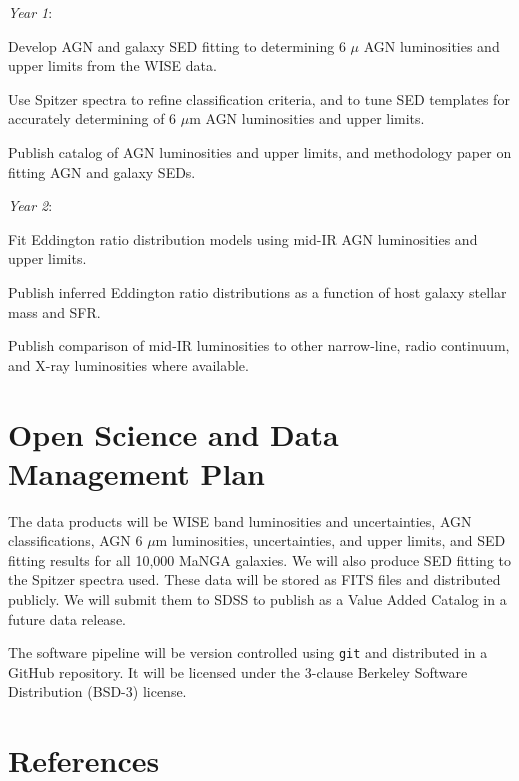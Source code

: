 \documentclass[12pt, preprint]{hacked-aastex}
\newlength{\mylen}
\newenvironment{ditemize}
{ \begin{list}{}{%
\setlength{\topsep}{0pt}%
\setlength{\partopsep}{3pt}%
\setlength{\itemsep}{1pt}\setlength{\parsep}{1pt}%
\setlength{\itemindent}{0pt}\setlength{\listparindent}{12pt}%
\setlength{\leftmargin}{24pt}\setlength{\rightmargin}{0in}%
\setlength{\labelsep}{6pt}\setlength{\labelwidth}{6pt}%
\setlength{\mylen}{3pt}
\renewcommand{\makelabel}{\makebox[\labelwidth][l]{\raisebox{\mylen}{\tiny$\bullet$}\hspace{\fill}}}}}
{\end{list}}
\begin{document}
\begin{ditemize}
\item {\it Year 1}: 
\begin{ditemize}
\item Develop AGN and galaxy SED fitting to determining 6 $\mu$ AGN luminosities and
upper limits from the WISE data.
\item Use Spitzer spectra to refine classification criteria, and to tune SED 
templates for accurately determining of 6 $\mu$m AGN luminosities and upper limits.
\item Publish catalog of AGN luminosities and upper limits, and methodology paper
on fitting AGN and galaxy SEDs.
\end{ditemize}
\item {\it Year 2}: 
\begin{ditemize}
\item Fit Eddington ratio distribution models 
using mid-IR AGN luminosities and upper limits.
\item Publish inferred  Eddington ratio distributions as a function of 
host galaxy stellar mass and SFR.
\item Publish comparison of mid-IR luminosities to other narrow-line,
radio continuum, and X-ray luminosities where available.
\end{ditemize}
\end{ditemize}

\section{Open Science and Data Management Plan\label{sec:data}}
\vspace{-6pt}

The data products will be WISE band luminosities and uncertainties, 
AGN classifications, AGN 6 $\mu$m luminosities, uncertainties, and 
upper limits, and SED fitting results for all 10,000 MaNGA galaxies. 
We will also produce SED fitting  to the Spitzer spectra used. These 
data will be stored as FITS files and distributed publicly.
We will submit them to SDSS to publish as a Value Added Catalog in a 
future data release.

The software pipeline will be version controlled using {\tt git} 
and distributed in a GitHub repository.
It will be licensed under the 3-clause Berkeley
Software Distribution (BSD-3) license.

\clearpage
\section{References}\label{sec:refs}
\end{document}
